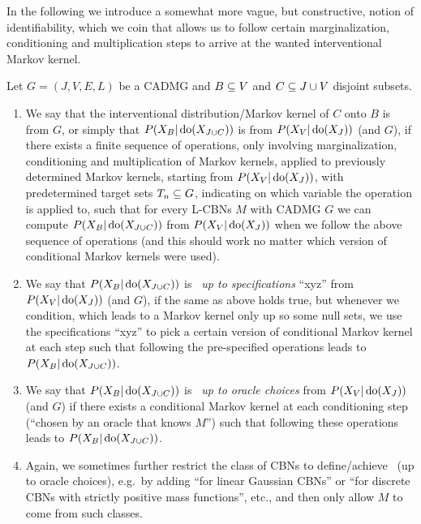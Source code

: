 In the following we introduce a somewhat more vague, but constructive, notion of identifiability, which we coin \emph{\trackability} that allows us to follow certain marginalization, conditioning and multiplication steps to arrive at the wanted interventional Markov kernel.

\begin{Def}
    Let $G=(J,V,E,L)$ be a CADMG and $B \subseteq V$ and $C \subseteq J \cup V$ disjoint subsets.
    \begin{enumerate}
        \item We say that the interventional distribution/Markov kernel of $C$ onto $B$ is \emph{\trackable} from $G$,
            or simply that $P(X_B|\operatorname{do}(X_{J \cup C}))$ is \emph{\trackable} from $P(X_V|\operatorname{do}(X_J))$ (and $G$),
    if there exists a finite sequence of operations, only involving marginalization, conditioning and multiplication of Markov kernels,
    applied to previously determined Markov kernels, starting from $P(X_V|\operatorname{do}(X_J))$, with predetermined target sets $T_n \subseteq G$,
    indicating on which variable the operation is applied to, such that for every L-CBNs $M$ with \observational CADMG $G$ 
    we can compute $P(X_B|\operatorname{do}(X_{J \cup C}))$ from $P(X_V|\operatorname{do}(X_J))$ when we follow the above sequence of operations (and this should work no matter which version of conditional Markov kernels were used).
\item We say that $P(X_B|\operatorname{do}(X_{J \cup C}))$ is \emph{\trackable\ up to specifications} ``xyz'' from $P(X_V|\operatorname{do}(X_J))$ (and $G$), if the same as above holds true, but whenever we condition,  which leads to a Markov kernel only up so some null sets, we use the specifications ``xyz'' to pick a certain version of conditional Markov kernel at each step such that following the pre-specified operations leads to $P(X_B|\operatorname{do}(X_{J \cup C}))$. 
\item We say that $P(X_B|\operatorname{do}(X_{J \cup C}))$ is \emph{\trackable\ up to oracle choices} from $P(X_V|\operatorname{do}(X_J))$ (and $G$) if there exists a conditional Markov kernel at each conditioning step (``chosen by an oracle that knows $M$'') 
    such that following these operations leads to $P(X_B|\operatorname{do}(X_{J \cup C}))$. 
\item    Again, we sometimes further restrict the class of CBNs to define/achieve \trackability\ (up to oracle choices), 
    e.g.\ by adding ``for linear Gaussian CBNs'' or ``for discrete CBNs with strictly positive mass functions'', etc., 
    and then only allow $M$ to come from such classes.
    \end{enumerate}
\end{Def}


